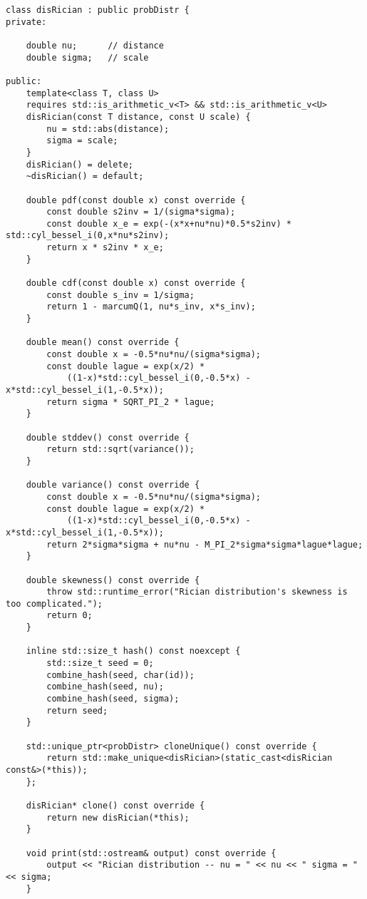 \begin{verbatim}
class disRician : public probDistr {
private:

    double nu;      // distance
    double sigma;   // scale

public:
    template<class T, class U>
    requires std::is_arithmetic_v<T> && std::is_arithmetic_v<U> 
    disRician(const T distance, const U scale) {
        nu = std::abs(distance);
        sigma = scale;
    }
    disRician() = delete;
    ~disRician() = default;

    double pdf(const double x) const override {
        const double s2inv = 1/(sigma*sigma);
        const double x_e = exp(-(x*x+nu*nu)*0.5*s2inv) * std::cyl_bessel_i(0,x*nu*s2inv);
        return x * s2inv * x_e;
    }

    double cdf(const double x) const override {
        const double s_inv = 1/sigma;
        return 1 - marcumQ(1, nu*s_inv, x*s_inv);
    }

    double mean() const override {
        const double x = -0.5*nu*nu/(sigma*sigma);
        const double lague = exp(x/2) * 
            ((1-x)*std::cyl_bessel_i(0,-0.5*x) - x*std::cyl_bessel_i(1,-0.5*x));
        return sigma * SQRT_PI_2 * lague;
    }

    double stddev() const override {
        return std::sqrt(variance());
    }

    double variance() const override {
        const double x = -0.5*nu*nu/(sigma*sigma);
        const double lague = exp(x/2) * 
            ((1-x)*std::cyl_bessel_i(0,-0.5*x) - x*std::cyl_bessel_i(1,-0.5*x));
        return 2*sigma*sigma + nu*nu - M_PI_2*sigma*sigma*lague*lague;
    }

    double skewness() const override {
        throw std::runtime_error("Rician distribution's skewness is too complicated.");
        return 0;
    }

    inline std::size_t hash() const noexcept {
        std::size_t seed = 0;
        combine_hash(seed, char(id));
        combine_hash(seed, nu);
        combine_hash(seed, sigma);
        return seed;
    } 

    std::unique_ptr<probDistr> cloneUnique() const override {
        return std::make_unique<disRician>(static_cast<disRician const&>(*this));
    };

    disRician* clone() const override {
        return new disRician(*this);
    }

    void print(std::ostream& output) const override {
        output << "Rician distribution -- nu = " << nu << " sigma = " << sigma;
    }


\end{verbatim}
